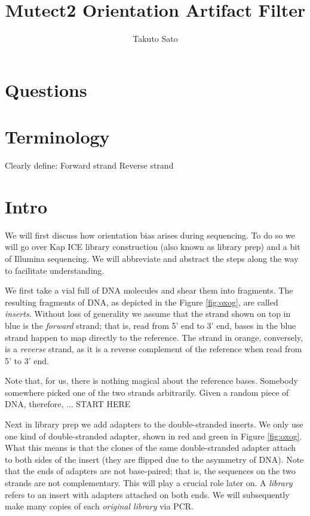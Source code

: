 \documentclass[a4paper]{article}
\title{Mutect2 Orientation Artifact Filter}
\author{Takuto Sato}
\begin{document}
\maketitle

\section{Questions}

\section{Terminology}
Clearly define:
Forward strand
Reverse strand

\section{Intro}
We will first discuss how orientation bias arises during sequencing. To do so we will go over Kap ICE library construction (also known as library prep) and a bit of Illumina sequencing. We will abbreviate and abstract the steps along the way to facilitate understanding. 

We first take a vial full of DNA molecules and shear them into fragments. The resulting fragments of DNA, as depicted in the Figure \ref{fig:oxog}, are called \textit{inserts}. Without loss of generality we assume that the strand shown on top in blue is the \textit{forward} strand; that is, read from 5' end to 3' end, bases in the blue strand happen to map directly to the reference. The strand in orange, conversely, is a \textit{reverse} strand, as it is a reverse complement of the reference when read from 5' to 3' end.

Note that, for us, there is nothing magical about the reference bases. Somebody somewhere picked one of the two strands arbitrarily. Given a random piece of DNA, therefore, ... START HERE

Next in library prep we add adapters to the double-stranded inserts. We only use one kind of double-stranded adapter, shown in red and green in Figure \ref{fig:oxog}. What this means is that the clones of the same double-stranded adapter attach to both sides of the insert (they are flipped due to the asymmetry of DNA). Note that the ends of adapters are not base-paired; that is, the sequences on the two strands are not complementary. This will play a crucial role later on.  A \textit{library} refers to an insert with adapters attached on both ends. We will subsequently make many copies of each \textit{original library} via PCR.
\end{document}
